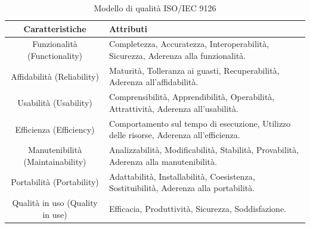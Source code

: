 \begin{table}[h!]
\centering
    \begin{tabular}{|c|p{6cm}|}
        \hline
        \textbf{Caratteristiche} & \textbf{Attributi}\\
        \hline
        Funzionalità (Functionality) & Completezza, Accuratezza, Interoperabilità, Sicurezza, Aderenza alla funzionalità. \\
        \hline
        Affidabilità (Reliability) & Maturità, Tolleranza ai guasti, Recuperabilità, Aderenza all'affidabilità.\\
        \hline
        Usabilità (Usability) & Comprensibilità, Apprendibilità, Operabilità, Attrattività, Aderenza all'usabilità. \\
        \hline
        Efficienza (Efficiency) & Comportamento sul tempo di esecuzione, Utilizzo delle risorse, Aderenza all'efficienza. \\
        \hline
        Manutenibilità (Maintainability) & Analizzabilità, Modificabilità, Stabilità, Provabilità, Aderenza alla manutenibilità.\\
        \hline
        Portabilità (Portability) & Adattabilità, Installabilità, Coesistenza, Sostituibilità, Aderenza alla portabilità.\\
        \hline
        Qualità in uso (Quality in use) & Efficacia, Produttività, Sicurezza, Soddisfazione.\\
        \hline
    \end{tabular}
    \caption{Modello di qualità ISO/IEC 9126}
    \label{tab:iso_iec9126}
\end{table}